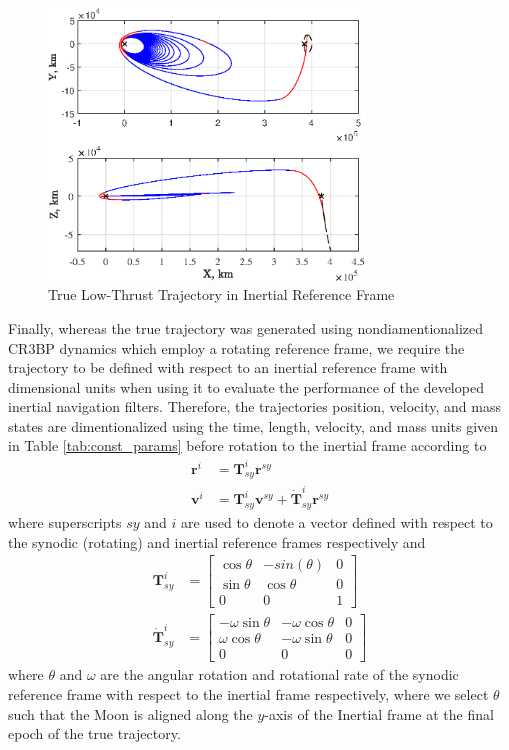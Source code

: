 \documentclass[letterpaper, paper,11pt]{AAS}		%
\begin{document}
\begin{figure}[]
	\centering
	\includegraphics[width=0.75\textwidth]{./../../figures/iTraj.eps}
	\caption{True Low-Thrust Trajectory in Inertial Reference Frame}
	\label{fig:traj}
\end{figure}

Finally, whereas the true trajectory was generated using nondiamentionalized CR3BP dynamics which employ a rotating reference frame, we require the trajectory to be defined with respect to an inertial reference frame with dimensional units when using it to evaluate the performance of the developed inertial navigation filters. Therefore, the trajectories position, velocity, and mass states are dimentionalized using the time, length, velocity, and mass units given in Table \ref{tab:const_params} before rotation to the inertial frame according to 
\begin{align}
	\mathbf{r}^i &= \mathbf{T}_{sy}^i\mathbf{r}^{sy}  \\
	\mathbf{v}^i &= \mathbf{T}_{sy}^i\mathbf{v}^{sy} + \dot{\mathbf{T}}_{sy}^i\mathbf{r}^{sy}
\end{align}
where superscripts $sy$ and $i$ are used to denote a vector defined with respect to the synodic (rotating) and inertial reference frames respectively and
\begin{align}
	\mathbf{T}_{sy}^i &= \begin{bmatrix}
		\cos{\theta} & -sin(\theta) & 0 \\
		\sin{\theta} & \cos{\theta} & 0 \\
		0 & 0 & 1
	\end{bmatrix} \\
	\dot{\mathbf{T}}_{sy}^i &= \begin{bmatrix}
		-\omega\sin{\theta} & -\omega\cos{\theta} & 0 \\
		\omega\cos{\theta} & -\omega\sin{\theta} & 0 \\
		0 & 0 & 0
	\end{bmatrix}
\end{align}
where $\theta$ and $\omega$ are the angular rotation and rotational rate of the synodic reference frame with respect to the inertial frame respectively, where we select $\theta$ such that the Moon is aligned along the $y$-axis of the Inertial frame at the final epoch of the true trajectory.
\end{document}
